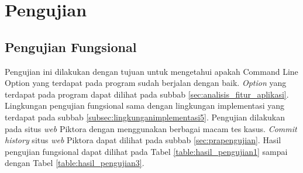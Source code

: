 \section{Pengujian}
\label{sec:pengujian}

\subsection{Pengujian Fungsional}
\label{sec:pengujian_fungsional} 
Pengujian ini dilakukan dengan tujuan untuk mengetahui apakah Command Line Option yang terdapat pada program sudah berjalan dengan baik. \textit{Option} yang terdapat pada program dapat dilihat pada subbab \ref{sec:analisis_fitur_aplikasi}. Lingkungan pengujian fungsional sama dengan lingkungan implementasi yang terdapat pada subbab \ref{subsec:lingkunganimplementasi5}. Pengujian dilakukan pada situs \textit{web} Piktora dengan menggunakan berbagai macam tes kasus. \textit{Commit history} situs \textit{web} Piktora dapat dilihat pada subbab \ref{sec:prapengujian}. Hasil pengujian fungsional dapat dilihat pada Tabel \ref{table:hasil_pengujian1} sampai dengan Tabel \ref{table:hasil_pengujian3}.


